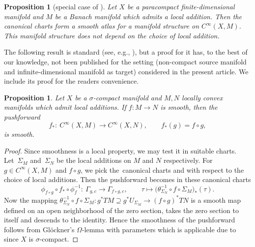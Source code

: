 \documentclass[11pt]{article}
\numberwithin{equation}{section}
\numberwithin{equation}{section}
\newtheorem{Proposition}[Theorem]{Proposition}
\begin{document}
\begin{Proposition}[{special case of \cite[Theorem~1.4]{GaS22}}]
 Let $X$ be a paracompact finite-dimensional manifold and $M$ be a Banach manifold which admits a local addition.
 Then the canonical charts %
 form a smooth atlas for a manifold structure on $C^\infty (X,M)$. This manifold structure does not depend on the choice of local addition.
\end{Proposition}

The following result is standard (see, e.g., \cite[Section 2]{Sch23}), but a proof for it has, to the best of our knowledge, not been published for the setting (non-compact source manifold and infinite-dimensional manifold as target) considered in the present article. We include its proof for the readers convenience.

\begin{Proposition}\label{prop:smooth_pf}
Let $X$ be a $\sigma$-compact manifold and $M,N$ locally convex manifolds which admit local additions. If $f \colon M \rightarrow N$ is smooth, then the pushforward
\begin{displaymath}f_\ast \colon \ C^\infty (X,M) \rightarrow C^\infty (X,N),\qquad f_\ast (g) =f \circ g,
\end{displaymath}
is smooth.
\end{Proposition}

\begin{proof}
Since smoothness is a local property, we may test it in suitable charts. Let~$\Sigma_M$ and~$\Sigma_N$ be the local additions on $M$ and $N$ respectively. For $g \in C^\infty (X,M)$ and $f \circ g$, we pick the~canonical charts  and  with respect to the choice of local additions. Then the pushforward becomes in these canonical charts
\begin{displaymath}\phi_{f\circ g} \circ f_* \circ \phi^{-1}_f \colon\ \Gamma_{g,c} \rightarrow \Gamma_{f\circ g, c},\qquad \tau \mapsto \bigl(\theta_{\Sigma_N}^{-1} \circ f \circ \Sigma_M\bigr)_*(\tau).\end{displaymath}
Now the mapping $\theta_{\Sigma_N}^{-1} \circ f \circ \Sigma_M \colon g^{\ast}TM \supseteq g^\ast U_{\Sigma_M} \rightarrow (f\circ g)^\ast TN$ is a smooth map defined on an open neighborhood of the zero section, takes the zero section to itself and descends to the identity. Hence the smoothness of the pushforward follows from Gl\"ockner's $\Omega$-lemma with parameters \cite[Theorem~F.23]{glo04} which is applicable due to \cite[Lemma F.19\,(c)]{glo04} since $X$ is $\sigma$-compact.
\end{proof}
\end{document}
